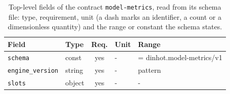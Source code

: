 \begin{table}[t]\centering\footnotesize
\caption{Top-level fields of the contract \texttt{model-metrics}, read from its schema file: type, requirement, unit (a dash marks an identifier, a count or a dimensionless quantity) and the range or constant the schema states.}\label{tab:contract-model-metrics}
\begin{tabular}{@{}l l c l >{\raggedright\arraybackslash}p{}@{}}\toprule Field & Type & Req. & Unit & Range\\\midrule
\texttt{\scriptsize schema} & const & yes & - & = dinhot.model-metrics/v1\\
\texttt{\scriptsize engine\_version} & string & yes & - & pattern\\
\texttt{\scriptsize slots} & object & yes & - & -\\
\bottomrule\end{tabular}\end{table}
